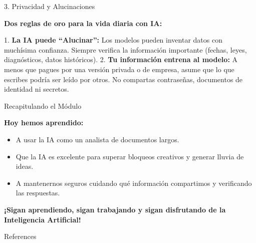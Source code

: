 \documentclass[aspectratio=169]{beamer}
\begin{document}
\begin{frame}[fragile]{3. Privacidad y Alucinaciones}


\textbf{Dos reglas de oro para la vida diaria con IA:}

1. \textbf{La IA puede ``Alucinar'':} Los modelos pueden inventar datos con muchísima confianza. Siempre verifica la información importante (fechas, leyes, diagnósticos, datos históricos).
2. \textbf{Tu información entrena al modelo:} A menos que pagues por una versión privada o de empresa, asume que lo que escribes podría ser leído por otros. No compartas contraseñas, documentos de identidad ni secretos.

\end{frame}



\begin{frame}[fragile]{Recapitulando el Módulo}


\textbf{Hoy hemos aprendido:}
\begin{itemize}
  \item A usar la IA como un analista de documentos largos.
  \item Que la IA es excelente para superar bloqueos creativos y generar lluvia de ideas.
  \item A mantenernos seguros cuidando qué información compartimos y verificando las respuestas.
\end{itemize}
\textbf{¡Sigan aprendiendo, sigan trabajando y sigan disfrutando de la Inteligencia Artificial!}
\end{frame}




\begin{frame}[allowframebreaks]{References}
  
  
\end{frame}
\end{document}
